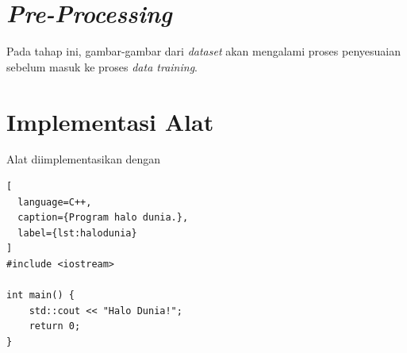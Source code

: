 \section{\textit{Pre-Processing}}
\label{sec:preprocessing}

Pada tahap ini, gambar-gambar dari \textit{dataset} akan mengalami proses penyesuaian sebelum masuk ke proses \textit{data training}.



\section{Implementasi Alat
\label{sec:implementasi alat}}

Alat diimplementasikan dengan \lipsum[1]

\begin{lstlisting}[
  language=C++,
  caption={Program halo dunia.},
  label={lst:halodunia}
]
#include <iostream>

int main() {
    std::cout << "Halo Dunia!";
    return 0;
}
\end{lstlisting}

\lipsum[2-3]



\lipsum[4]
